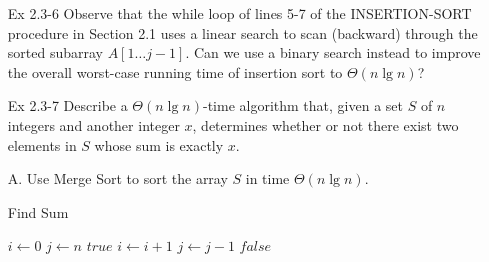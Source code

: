 \documentclass[fontsize=12pt,paper=a4]{book}
\begin{document}
\begin{enumerate}
 \item[Ex 2.3-6]
       Observe that the while loop of lines 5-7 of the INSERTION-SORT procedure in Section 2.1 uses a linear search to scan (backward) through the sorted subarray $A[1 \dots j-1]$. Can we use a binary search instead to improve the overall worst-case running time of insertion sort to $\Theta(n \lg n)$?
       
 \item[Ex 2.3-7]
       Describe a $\Theta(n \lg n)$-time algorithm that, given a set $S$ of $n$ integers and another integer $x$, determines whether or not there exist two elements in $S$ whose sum is exactly $x$.
 \item[A.]
       Use Merge Sort to sort the array $S$ in time $\Theta(n \lg n)$.\\
       \begin{algorithm}
        \caption{Find Sum}
        \begin{algorithmic}[1]
         \State $i \gets 0$
         \State $j \gets n$
         \State \Return $true$
         \EndIf
         \EndWhile
         \State $i \gets i+1$
         \EndIf
         \State $j \gets j-1$
         \EndIf
         \State \Return $false$
         \EndProcedure
        \end{algorithmic}
       \end{algorithm}
\end{enumerate}
\end{document}
